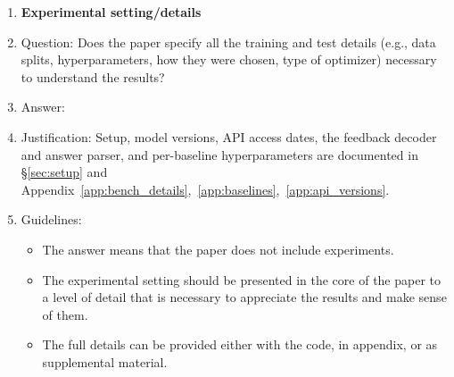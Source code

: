 \documentclass[11pt]{article}
\begin{document}
\begin{enumerate}
\item {\bf Experimental setting/details}
    \item[] Question: Does the paper specify all the training and test details (e.g., data splits, hyperparameters, how they were chosen, type of optimizer) necessary to understand the results?
    \item[] Answer: \answerYes{}
    \item[] Justification: Setup, model versions, API access dates, the feedback decoder and answer parser, and per-baseline hyperparameters are documented in \S\ref{sec:setup} and Appendix~\ref{app:bench_details},~\ref{app:baselines},~\ref{app:api_versions}.
    \item[] Guidelines:
    \begin{itemize}
        \item The answer \answerNA{} means that the paper does not include experiments.
        \item The experimental setting should be presented in the core of the paper to a level of detail that is necessary to appreciate the results and make sense of them.
        \item The full details can be provided either with the code, in appendix, or as supplemental material.
    \end{itemize}


\end{enumerate}
\end{document}
